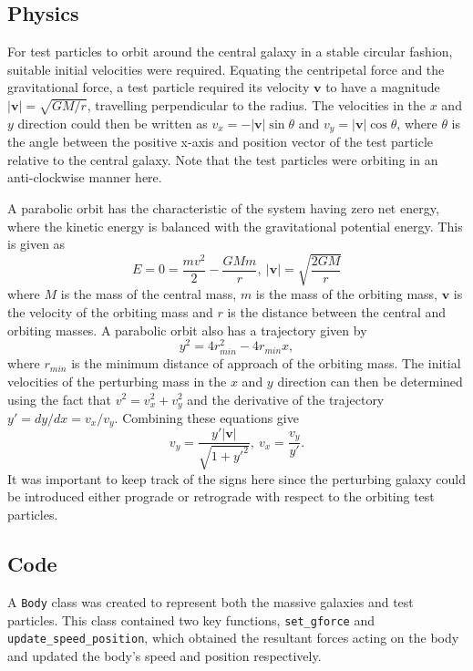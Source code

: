 \documentclass[twoside,twocolumn]{article}
\begin{document}
    \subsection{Physics}
        \label{section:physics}

        For test particles to orbit around the central galaxy in a stable circular fashion, suitable initial velocities were required. Equating the centripetal force and the gravitational force, a test particle required its velocity $\bm{v}$ to have a magnitude $\lvert\bm{v}\lvert = \sqrt{GM/r}$, travelling perpendicular to the radius. The velocities in the $x$ and $y$ direction could then be written as $v_x = - \lvert\bm{v}\lvert \sin{\theta}$ and $v_y = \lvert\bm{v}\lvert \cos{\theta}$, where $\theta$ is the angle between the positive x-axis and position vector of the test particle relative to the central galaxy. Note that the test particles were orbiting in an anti-clockwise manner here.


        A parabolic orbit has the characteristic of the system having zero net energy, where the kinetic energy is balanced with the gravitational potential energy. This is given as
        \begin{equation}
            E = 0 = \frac{mv^2}{2} - \frac{GMm}{r}, \ \lvert\bm{v}\lvert = \sqrt{\frac{2GM}{r}}
        \end{equation}
        where $M$ is the mass of the central mass, $m$ is the mass of the orbiting mass, $\bm{v}$ is the velocity of the orbiting mass and $r$ is the distance between the central and orbiting masses. A parabolic orbit also has a trajectory given by \cite{lecture}
        \begin{equation}
            y^2 = 4r_{min}^2 - 4r_{min}x,
        \end{equation}
        where $r_{min}$ is the minimum distance of approach of the orbiting mass. The initial velocities of the perturbing mass in the $x$ and $y$ direction can then be determined using the fact that $v^2 = v_x^2 + v_y^2$ and the derivative of the trajectory $y' = dy/dx = v_x/v_y$. Combining these equations give
        \begin{equation}
            v_y = \frac{y'\lvert\bm{v}\lvert}{\sqrt{1 + y'^2}}, \ v_x = \frac{v_y}{y'}.
        \end{equation}
        It was important to keep track of the signs here since the perturbing galaxy could be introduced either prograde or retrograde with respect to the orbiting test particles.
    
    \subsection{Code}
        A \texttt{Body} class was created to represent both the massive galaxies and test particles. This class contained two key functions, \texttt{set\_gforce} and \texttt{update\_speed\_position}, which obtained the resultant forces acting on the body and updated the body's speed and position respectively.
\end{document}
